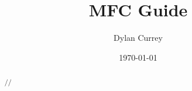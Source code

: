 \documentclass{article}
\begin{document}

\title{MFC Guide}
\author{Dylan Currey}
\date{\today}
\maketitle

\begin{abstract}
    //
\end{abstract}

\newpage

\tableofcontents
\listoffigures
\newpage
{}


\clearpage
\end{document}
